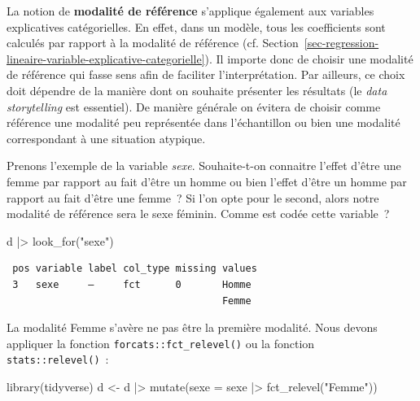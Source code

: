 \documentclass[
  letterpaper,
  DIV=11,
  numbers=noendperiod,
  oneside]{scrreprt}
\newenvironment{Shaded}{\begin{snugshade}}{\end{snugshade}}
\newcommand{\AttributeTok}[1]{\textcolor[rgb]{0.40,0.45,0.13}{#1}}
\newcommand{\FunctionTok}[1]{\textcolor[rgb]{0.28,0.35,0.67}{#1}}
\newcommand{\NormalTok}[1]{\textcolor[rgb]{0.00,0.23,0.31}{#1}}
\newcommand{\OtherTok}[1]{\textcolor[rgb]{0.00,0.23,0.31}{#1}}
\newcommand{\SpecialCharTok}[1]{\textcolor[rgb]{0.37,0.37,0.37}{#1}}
\newcommand{\StringTok}[1]{\textcolor[rgb]{0.13,0.47,0.30}{#1}}
\begin{document}
La notion de \textbf{modalité de référence} s'applique également aux
variables explicatives catégorielles. En effet, dans un modèle, tous les
coefficients sont calculés par rapport à la modalité de référence (cf.
Section~\ref{sec-regression-lineaire-variable-explicative-categorielle}).
Il importe donc de choisir une modalité de référence qui fasse sens afin
de faciliter l'interprétation. Par ailleurs, ce choix doit dépendre de
la manière dont on souhaite présenter les résultats (le \emph{data
storytelling} est essentiel). De manière générale on évitera de choisir
comme référence une modalité peu représentée dans l'échantillon ou bien
une modalité correspondant à une situation atypique.

Prenons l'exemple de la variable \emph{sexe}. Souhaite-t-on connaitre
l'effet d'être une femme par rapport au fait d'être un homme ou bien
l'effet d'être un homme par rapport au fait d'être une femme~? Si l'on
opte pour le second, alors notre modalité de référence sera le sexe
féminin. Comme est codée cette variable~?

\begin{Shaded}
\begin{Highlighting}[]
\NormalTok{d }\SpecialCharTok{|\textgreater{}} \FunctionTok{look\_for}\NormalTok{(}\StringTok{"sexe"}\NormalTok{)}
\end{Highlighting}
\end{Shaded}

\begin{verbatim}
 pos variable label col_type missing values
 3   sexe     —     fct      0       Homme 
                                     Femme 
\end{verbatim}

La modalité Femme s'avère ne pas être la première modalité. Nous devons
appliquer la fonction \texttt{forcats::fct\_relevel()} ou la fonction
\texttt{stats::relevel()}~:

\begin{Shaded}
\begin{Highlighting}[]
\FunctionTok{library}\NormalTok{(tidyverse)}
\NormalTok{d }\OtherTok{\textless{}{-}}\NormalTok{ d }\SpecialCharTok{|\textgreater{}} 
  \FunctionTok{mutate}\NormalTok{(}\AttributeTok{sexe =}\NormalTok{ sexe }\SpecialCharTok{|\textgreater{}} \FunctionTok{fct\_relevel}\NormalTok{(}\StringTok{"Femme"}\NormalTok{))}
\end{Highlighting}
\end{Shaded}

\begin{Shaded}
\end{Shaded}
\end{document}
